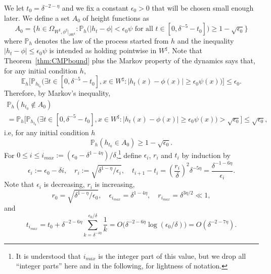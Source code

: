 \documentclass[AHL,Unicode,longabstracts,published]{cedram}
\newcommand{\E}{\mathbb{E}}
\renewcommand{\P}{\mathbb{P}}
\newcommand{\eps}{\epsilon}
\renewcommand{\d}{{\sharp }}
\let\oldexists\exists
\renewcommand*{\exists}{\mathrel{\oldexists}}
\begin{document}
We let $t_0=\delta^{-2-\eta}$ and we fix a constant $\epsilon_0>0$ that will be chosen small enough later. We define a set $A_0$ of height functions as
\begin{equation}\label{eq:A}
A_0=\Big\{h\in \Omega_{W^\d,\phi^\d|_{\partial W^\d}}:\P_h\Big(|h_t-\phi|<\epsilon_0\psi\text{ for all }t\in \left[0,\delta^{-5}-t_0\right]\Big)\geq 1 -\sqrt{\epsilon_0}\Big\}
\end{equation}
where $\P_h$ denotes the law of the process started from $h$ and the inequality $|h_t-\phi|\le \epsilon_0\psi$ is intended as holding pointwise in $W^\d$. Note that Theorem~\ref{thm:CMPbound} plus the Markov property of the dynamics says that, for any initial condition $h$,
\begin{equation}
\E_h\Big[\P_{h_{t_0}}\Big(\exists t\in \left[0,\delta^{-5}-t_0\right],x\in W^\d:|h_t(x)-\phi(x)|\geq\epsilon_0\psi(x)\Big)\Big]\le
\epsilon_0.
\end{equation}
Therefore, by Markov's inequality,
\begin{multline}
\P_h(h_{t_0}\not\in A_0)\\
=\P_h\Big[\P_{h_{t_0}}\Big(\exists t\in \left[0,\delta^{-5}-t_0\right],x\in W^\d:|h_t(x)-\phi(x)|\ge \epsilon_0 \psi(x)\Big)>\sqrt{\epsilon_0}\Big]\le \sqrt{\epsilon_0},
\end{multline}
i.e, for any initial condition $h$
\begin{equation}\label{eq:ie}
\P_h(h_{t_0}\in A_0)\ge 1-\sqrt{\epsilon_0}.
\end{equation}
For $0\le i\le i_{max}:=(\epsilon_0-\delta^{1-4\eta})/\delta$,\footnote{It is understood that $i_{max}$ is the integer part of this value, but we drop all ``integer parts'' here and in the following, for lightness of notation.} define $\eps_i$, $r_i$ and $t_i$ by induction by
\begin{equation}\label{eq:ri}
\epsilon_i:=\epsilon_0-\delta i, \quad r_i := \sqrt{\delta^{1-\eta}/\epsilon_i}, \quad t_{i+1}-t_i=\left(\frac{r_i}\delta\right)^{2}\delta^{-5\eta}= \frac{\delta^{-1-6\eta}}{\epsilon_i}.
\end{equation}
Note that $\eps_i$ is decreasing, $r_i$ is increasing,
\begin{equation}\label{eq:r0rimax}
r_0 = \sqrt{\delta^{1-\eta}/\epsilon_0}, \quad \epsilon_{i_{max}}=\delta^{1-4\eta}, \quad r_{i_{max}}= \delta^{3\eta/2}\ll 1,
\end{equation}
and
\begin{equation}\label{eq:tmax}
t_{i_{max}}=t_0+\delta^{-2-6\eta}\sum_{k=\delta^{-4\eta}}^{\epsilon_0/\delta}\frac1k= O\Big(\delta^{-2-6\eta}\log(\epsilon_0/\delta)\Big)=O(\delta^{-2-7\eta}).
\end{equation}
\end{document}
